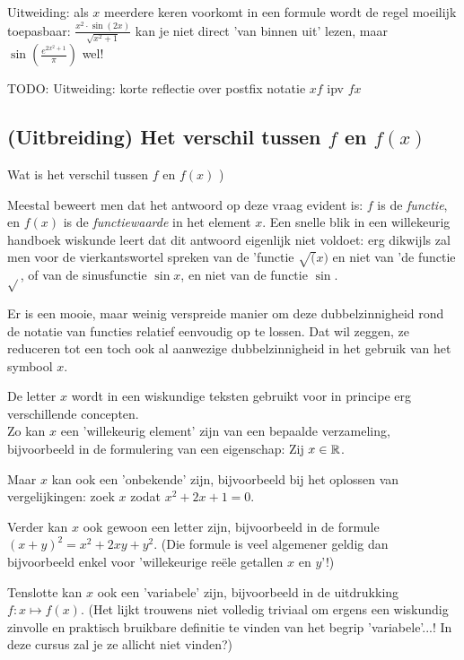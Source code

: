 \documentclass{ximera}
\begin{document}
Uitweiding: als $x$ meerdere keren voorkomt in een formule wordt de regel moeilijk toepasbaar: $\frac{x^2\cdot\sin(2x)}{\sqrt{x^2+1}}$ kan je niet direct 'van binnen uit' lezen, maar $\sin(\frac{e^{2x^2+1}}{\pi})$ wel!

TODO: Uitweiding: korte reflectie over postfix notatie $xf$ ipv $fx$

\subsection{(Uitbreiding) Het verschil tussen $f$ en $f(x)$}

\begin{uitweiding} Wat is het verschil tussen $f$ en $f(x)$ )

Meestal beweert men dat het antwoord op deze vraag evident is: $f$ is de \textit{functie}, en $f(x)$ is de \textit{functiewaarde} in het element $x$. Een snelle blik in een willekeurig handboek wiskunde leert dat dit antwoord  eigenlijk niet voldoet: erg dikwijls zal men voor de vierkantswortel spreken van de 'functie $\sqrt(x)$ en niet van 'de functie $\sqrt{}$, of van de sinusfunctie $\sin x$, en niet van de functie $\sin$.

\begin{expandable}
Er is een mooie, maar weinig verspreide manier om deze dubbelzinnigheid rond de notatie van functies relatief eenvoudig op te lossen. Dat wil zeggen, ze reduceren tot een toch ook al aanwezige dubbelzinnigheid in het gebruik van het symbool $x$. 

De letter $x$ wordt in een wiskundige teksten gebruikt voor in principe erg verschillende concepten. 
\\

Zo kan $x$ een 'willekeurig element' zijn van een bepaalde verzameling, bijvoorbeeld in de formulering van een eigenschap: Zij $x\in\mathbb{R}$.

Maar $x$ kan ook een 'onbekende' zijn, bijvoorbeeld bij het oplossen van vergelijkingen: zoek $x$ zodat $x^2+2x+1=0$. 

Verder kan $x$ ook gewoon een letter zijn, bijvoorbeeld in de formule $(x+y)^2 = x^2+2xy+y^2$. (Die formule is veel algemener geldig dan bijvoorbeeld enkel voor 'willekeurige reële getallen $x$ en $y$'!)

Tenslotte kan $x$ ook een 'variabele' zijn, bijvoorbeeld in de uitdrukking $f:x\mapsto f(x)$. (Het lijkt trouwens niet volledig triviaal om ergens een wiskundig zinvolle en praktisch bruikbare definitie te vinden van het begrip 'variabele'...! In deze cursus zal je ze allicht niet vinden?)



\end{expandable}
\end{uitweiding}
\end{document}

